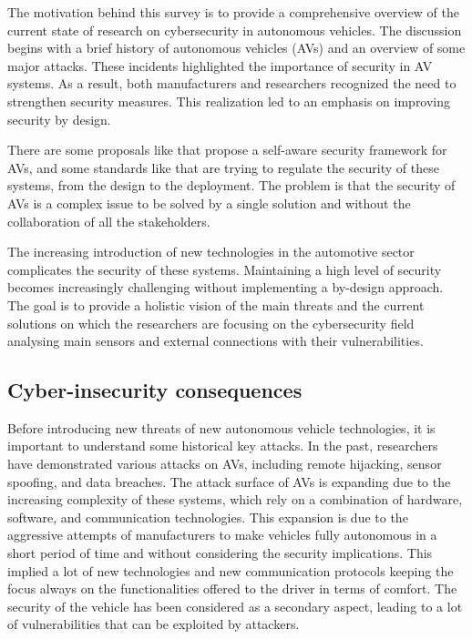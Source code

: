 The motivation behind this survey is to provide a comprehensive overview of the current state of research on cybersecurity in autonomous vehicles.
The discussion begins with a brief history of autonomous vehicles (AVs) and an overview of some major attacks.
These incidents highlighted the importance of security in AV systems.
As a result, both manufacturers and researchers recognized the need to strengthen security measures.
This realization led to an emphasis on improving security by design.

There are some proposals like \cite{adu-kyere2023self-aware} that propose a self-aware security framework for AVs, and some standards like \cite{comparison-standard} that are trying to regulate the security of these systems, from the design to the deployment.
The problem is that the security of AVs is a complex issue to be solved by a single solution and without the collaboration of all the stakeholders.

The increasing introduction of new technologies in the automotive sector complicates the security of these systems.
Maintaining a high level of security becomes increasingly challenging without implementing a by-design approach.
The goal is to provide a holistic vision of the main threats and the current solutions on which the researchers are focusing on the cybersecurity field analysing main sensors and external connections with their vulnerabilities.


\subsection{Cyber-insecurity consequences}\label{subsec:cyber-insecurity}

Before introducing new threats of new autonomous vehicle technologies, it is important to understand some historical key attacks.
In the past, researchers have demonstrated various attacks on AVs, including remote hijacking, sensor spoofing, and data breaches.
The attack surface of AVs is expanding due to the increasing complexity of these systems, which rely on a combination of hardware, software, and communication technologies\cite{cybersec}.
This expansion is due to the aggressive attempts of manufacturers to
make vehicles fully autonomous in a short period of time and without considering the security implications.
This implied a lot of new technologies and new communication protocols keeping the focus always on the functionalities offered to the driver in terms of comfort.
The security of the vehicle has been considered as a secondary aspect, leading to a lot of vulnerabilities that can be exploited by attackers.

